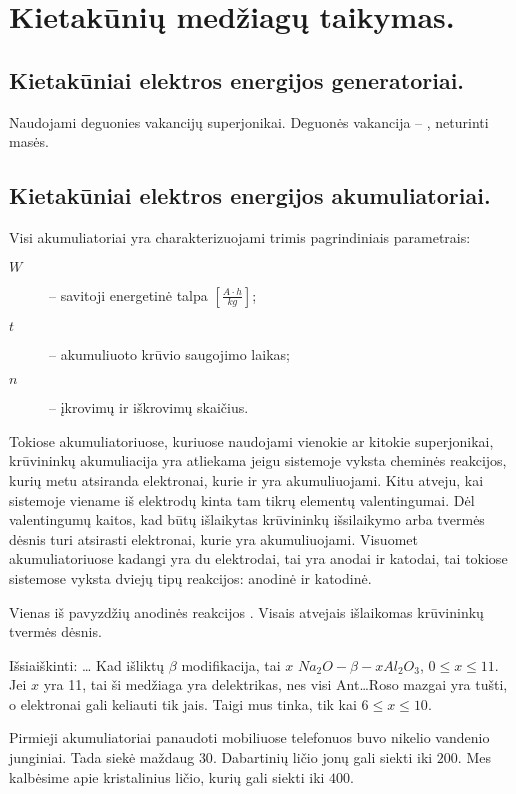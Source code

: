 \chapter{Kietakūnių medžiagų taikymas.}
\section{Kietakūniai elektros energijos generatoriai.}
Naudojami deguonies vakancijų superjonikai. Deguonės vakancija – ,
neturinti masės.
\section{Kietakūniai elektros energijos akumuliatoriai.}

Visi akumuliatoriai yra charakterizuojami trimis pagrindiniais parametrais:
\begin{description}
  \item[$W$]  – savitoji energetinė talpa
    $\left[ \frac{A \cdot h}{kg} \right]$;
  \item[$t$] – akumuliuoto krūvio saugojimo laikas;
  \item[$n$] – įkrovimų ir iškrovimų skaičius.
\end{description}

Tokiose akumuliatoriuose, kuriuose naudojami vienokie ar kitokie
superjonikai, krūvininkų akumuliacija yra atliekama jeigu sistemoje
vyksta cheminės reakcijos, kurių metu atsiranda elektronai, kurie
ir yra akumuliuojami. Kitu atveju, kai sistemoje viename iš
elektrodų kinta tam tikrų elementų valentingumai. Dėl valentingumų
kaitos, kad būtų išlaikytas krūvininkų išsilaikymo arba tvermės
dėsnis turi atsirasti elektronai, kurie yra akumuliuojami.
Visuomet akumuliatoriuose kadangi yra du elektrodai, tai yra anodai
ir katodai, tai tokiose sistemose vyksta dviejų tipų reakcijos:
anodinė ir katodinė.

Vienas iš pavyzdžių anodinės reakcijos .
Visais atvejais išlaikomas krūvininkų tvermės dėsnis.

Išsiaiškinti:
…
Kad išliktų $\beta$ modifikacija, tai $x$ $Na_{2}O-\beta-x Al_{2}O_{3}$,
$0 \leq x \leq 11$. Jei $x$ yra 11, tai ši medžiaga yra delektrikas,
nes visi Ant…Roso mazgai yra tušti, o elektronai gali keliauti tik
jais. Taigi mus tinka, tik kai $6 \leq x \leq 10$.

Pirmieji akumuliatoriai panaudoti mobiliuose telefonuos buvo nikelio
vandenio junginiai. Tada siekė maždaug $30$. Dabartinių ličio
jonų gali siekti iki $200$. Mes kalbėsime apie kristalinius
ličio, kurių gali siekti iki $400$.

